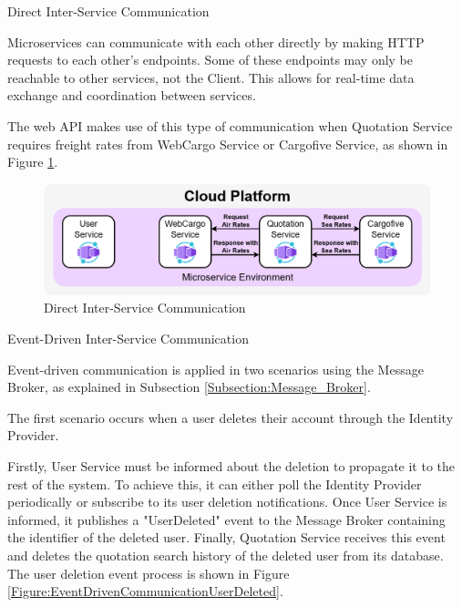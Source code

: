 \documentclass[12pt, reqno]{amsbook}
\makeatletter
\def\subsection{\@startsection{subsection}{2}%
      \z@{.5\linespacing\@plus.7\linespacing}{.25\linespacing}%
      {\normalfont\bfseries\flushleft}}
\theoremstyle{definition}
\theoremstyle{definition}
\numberwithin{section}{chapter}
\numberwithin{table}{chapter}
\numberwithin{figure}{chapter}
\makeatother
\begin{document}
\subsection{Direct Inter-Service Communication}
\label{Subsection:Direct_Inter_Service_Communication}

Microservices can communicate with each other directly by making \ac{HTTP} requests to each other's endpoints. Some of these endpoints may only be reachable to other services, not the Client. This allows for real-time data exchange and coordination between services.

The web \ac{API} makes use of this type of communication when Quotation Service requires freight rates from WebCargo Service or Cargofive Service, as shown in Figure \ref{Figure:DirectCommunication}.

\begin{figure}[H]
  \centering
  \includegraphics[width=0.9\linewidth]{images/DirectCommunication.png}
  \caption{\label{Figure:DirectCommunication}Direct Inter-Service Communication}
\end{figure}

\subsection{Event-Driven Inter-Service Communication}
\label{Subsection:Event_Driven_Inter_Service_Communication}

Event-driven communication is applied in two scenarios using the Message Broker, as explained in Subsection \ref{Subsection:Message_Broker}.

The first scenario occurs when a user deletes their account through the Identity Provider.

Firstly, User Service must be informed about the deletion to propagate it to the rest of the system. To achieve this, it can either poll the Identity Provider periodically or subscribe to its user deletion notifications. Once User Service is informed, it publishes a "UserDeleted" event to the Message Broker containing the identifier of the deleted user. Finally, Quotation Service receives this event and deletes the quotation search history of the deleted user from its database. The user deletion event process is shown in Figure \ref{Figure:EventDrivenCommunicationUserDeleted}.
\end{document}
